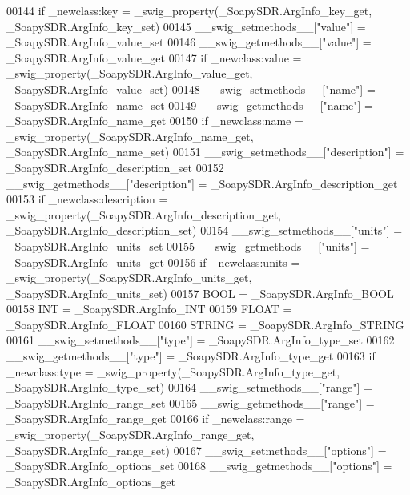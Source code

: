 \begin{DoxyCode}
{{{00144     \textcolor{keywordflow}{if} \_newclass:key = _swig_property(\_SoapySDR.ArgInfo\_key\_get, \_SoapySDR.ArgInfo\_key\_set)
00145     \_\_swig\_setmethods\_\_[\textcolor{stringliteral}{"value"}] = \_SoapySDR.ArgInfo\_value\_set
00146     \_\_swig\_getmethods\_\_[\textcolor{stringliteral}{"value"}] = \_SoapySDR.ArgInfo\_value\_get
00147     \textcolor{keywordflow}{if} \_newclass:value = _swig_property(\_SoapySDR.ArgInfo\_value\_get, \_SoapySDR.ArgInfo\_value\_set)
00148     \_\_swig\_setmethods\_\_[\textcolor{stringliteral}{"name"}] = \_SoapySDR.ArgInfo\_name\_set
00149     \_\_swig\_getmethods\_\_[\textcolor{stringliteral}{"name"}] = \_SoapySDR.ArgInfo\_name\_get
00150     \textcolor{keywordflow}{if} \_newclass:name = _swig_property(\_SoapySDR.ArgInfo\_name\_get, \_SoapySDR.ArgInfo\_name\_set)
00151     \_\_swig\_setmethods\_\_[\textcolor{stringliteral}{"description"}] = \_SoapySDR.ArgInfo\_description\_set
00152     \_\_swig\_getmethods\_\_[\textcolor{stringliteral}{"description"}] = \_SoapySDR.ArgInfo\_description\_get
00153     \textcolor{keywordflow}{if} \_newclass:description = _swig_property(\_SoapySDR.ArgInfo\_description\_get, 
      \_SoapySDR.ArgInfo\_description\_set)
00154     \_\_swig\_setmethods\_\_[\textcolor{stringliteral}{"units"}] = \_SoapySDR.ArgInfo\_units\_set
00155     \_\_swig\_getmethods\_\_[\textcolor{stringliteral}{"units"}] = \_SoapySDR.ArgInfo\_units\_get
00156     \textcolor{keywordflow}{if} \_newclass:units = _swig_property(\_SoapySDR.ArgInfo\_units\_get, \_SoapySDR.ArgInfo\_units\_set)
00157     BOOL = \_SoapySDR.ArgInfo\_BOOL
00158     INT = \_SoapySDR.ArgInfo\_INT
00159     FLOAT = \_SoapySDR.ArgInfo\_FLOAT
00160     STRING = \_SoapySDR.ArgInfo\_STRING
00161     \_\_swig\_setmethods\_\_[\textcolor{stringliteral}{"type"}] = \_SoapySDR.ArgInfo\_type\_set
00162     \_\_swig\_getmethods\_\_[\textcolor{stringliteral}{"type"}] = \_SoapySDR.ArgInfo\_type\_get
00163     \textcolor{keywordflow}{if} \_newclass:type = _swig_property(\_SoapySDR.ArgInfo\_type\_get, \_SoapySDR.ArgInfo\_type\_set)
00164     \_\_swig\_setmethods\_\_[\textcolor{stringliteral}{"range"}] = \_SoapySDR.ArgInfo\_range\_set
00165     \_\_swig\_getmethods\_\_[\textcolor{stringliteral}{"range"}] = \_SoapySDR.ArgInfo\_range\_get
00166     \textcolor{keywordflow}{if} \_newclass:range = _swig_property(\_SoapySDR.ArgInfo\_range\_get, \_SoapySDR.ArgInfo\_range\_set)
00167     \_\_swig\_setmethods\_\_[\textcolor{stringliteral}{"options"}] = \_SoapySDR.ArgInfo\_options\_set
00168     \_\_swig\_getmethods\_\_[\textcolor{stringliteral}{"options"}] = \_SoapySDR.ArgInfo\_options\_get
}}}
\end{DoxyCode}
